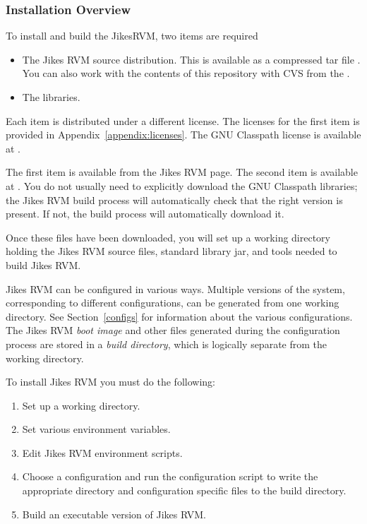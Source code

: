 \AIXPPCJikesTMFooter

\JavaTMFooter

\subsubsection{Installation Overview}

To install and build the Jikes\trademark RVM, two items are required
\begin{itemize}
\item The Jikes RVM source distribution.  This is available as a
compressed tar file {\tt \RVMTarFile}.  You can also work with the
contents of this repository with CVS from the 
.

\item The 
 libraries. 
\end{itemize}

Each item is distributed under a different license.  The licenses for
the first item is provided in Appendix~\ref{appendix:licenses}.  The
GNU Classpath license is available at \xlink{{\tt
\classpathURL}}{\classpathURL}. 

The first item is available  from the Jikes RVM
 page. The second item is available at
\xlink{{\tt \classpathURL}}{\classpathURL}.
You do not usually need to explicitly download the GNU Classpath
libraries; the Jikes RVM build process will automatically check that
the right version is present. If not, the build process will
automatically download it.

Once these files have been downloaded, you will set up 
a working directory holding the Jikes RVM source files, standard
library jar, and tools needed to build Jikes RVM. 

Jikes RVM can be configured in various ways. Multiple versions of the system,
corresponding to different configurations, can be generated from 
one working directory. See Section~\ref{configs} for information about the 
various 
configurations.
The Jikes RVM  {\em boot image} and other files generated during the 
configuration process
are stored in a {\em build directory}, which is logically separate from 
the working directory. 

To install Jikes RVM  you must do the following:
\begin{enumerate}
\item Set up a working directory.
\item Set various environment variables.
\item Edit Jikes RVM environment scripts.
\item Choose a configuration and run the configuration script to write
the appropriate directory and configuration specific files to the
build directory.
\item Build an executable version of Jikes RVM.
\end{enumerate}

